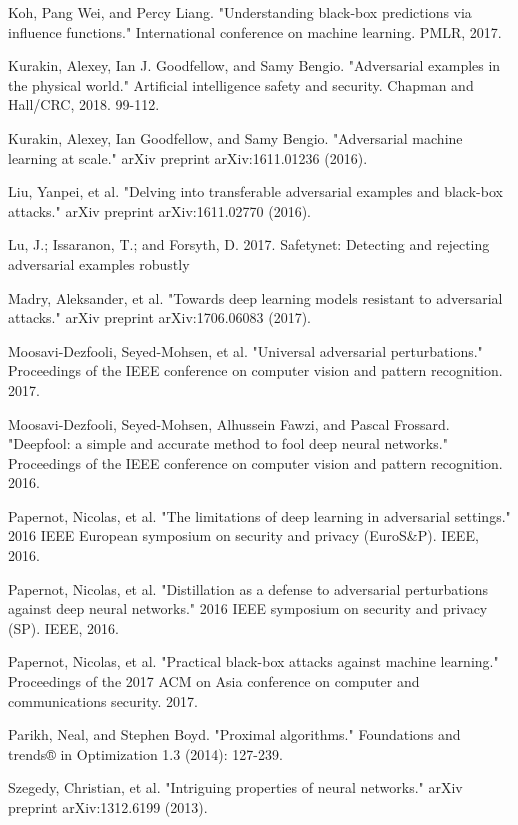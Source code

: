 \begin{thebibliography}{9}
    \bibitem{}
    Koh, Pang Wei, and Percy Liang. "Understanding black-box predictions via influence functions." International conference on machine learning. PMLR, 2017.

    \bibitem{}
    Kurakin, Alexey, Ian J. Goodfellow, and Samy Bengio. "Adversarial examples in the physical world." Artificial intelligence safety and security. Chapman and Hall/CRC, 2018. 99-112.

    \bibitem{}
    Kurakin, Alexey, Ian Goodfellow, and Samy Bengio. "Adversarial machine learning at scale." arXiv preprint arXiv:1611.01236 (2016).

    \bibitem{}
    Liu, Yanpei, et al. "Delving into transferable adversarial examples and black-box attacks." arXiv preprint arXiv:1611.02770 (2016).

    \bibitem{}
    Lu, J.; Issaranon, T.; and Forsyth, D. 2017. Safetynet: Detecting and rejecting adversarial examples robustly

    \bibitem{}
    Madry, Aleksander, et al. "Towards deep learning models resistant to adversarial attacks." arXiv preprint arXiv:1706.06083 (2017).

    \bibitem{}
    Moosavi-Dezfooli, Seyed-Mohsen, et al. "Universal adversarial perturbations." Proceedings of the IEEE conference on computer vision and pattern recognition. 2017.

    \bibitem{}
    Moosavi-Dezfooli, Seyed-Mohsen, Alhussein Fawzi, and Pascal Frossard. "Deepfool: a simple and accurate method to fool deep neural networks." Proceedings of the IEEE conference on computer vision and pattern recognition. 2016.

    \bibitem{}
    Papernot, Nicolas, et al. "The limitations of deep learning in adversarial settings." 2016 IEEE European symposium on security and privacy (EuroS\&P). IEEE, 2016.

    \bibitem{}
    Papernot, Nicolas, et al. "Distillation as a defense to adversarial perturbations against deep neural networks." 2016 IEEE symposium on security and privacy (SP). IEEE, 2016.

    \bibitem{}
    Papernot, Nicolas, et al. "Practical black-box attacks against machine learning." Proceedings of the 2017 ACM on Asia conference on computer and communications security. 2017.

    \bibitem{}
    Parikh, Neal, and Stephen Boyd. "Proximal algorithms." Foundations and trends® in Optimization 1.3 (2014): 127-239.

    \bibitem{}
    Szegedy, Christian, et al. "Intriguing properties of neural networks." arXiv preprint arXiv:1312.6199 (2013).


\end{thebibliography}
